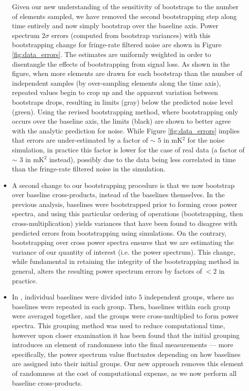 \documentclass[preprint2,numberedappendix,tighten]{aastex6}  %
\begin{document}
\begin{itemize}
{Given our new understanding of the sensitivity of bootstraps to the number of elements sampled, we have removed the second 
bootstrapping step along time entirely and now simply bootstrap over the baseline axis. Power spectrum $2\sigma$ errors (computed from bootstrap variances) with this bootstrapping change for fringe-rate filtered noise are shown in Figure 
\ref{fig:data_errors}. The estimates are uniformly weighted in order to disentangle the effects of bootstrapping from signal loss. As 
shown in the figure, when more elements are drawn for each bootstrap than the number of 
independent samples (by over-sampling elements along the time axis), repeated values begin to crop up and the apparent variation between bootstraps drops, resulting in limits (gray) below the predicted noise level (green). Using the revised bootstrapping method, where bootstrapping only occurs over the baseline axis, the limits (black) are shown to better agree with the analytic prediction for noise. While Figure \ref{fig:data_errors} implies that errors are under-estimated by a factor of $\sim$ $5$ in mK$^{2}$ for the noise simulation, in practice this factor is lower for the case of real data (a factor of $\sim$ $3$ in mK$^{2}$ instead), possibly due to the data being less correlated in time than the fringe-rate filtered noise in the simulation. }%

\item{A second change to our bootstrapping procedure is that we now bootstrap over baseline cross-products, instead of the baselines themselves. In the previous analysis, baselines were bootstrapped prior to forming cross power spectra, and using this particular ordering of operations (bootstrapping, then cross-multiplication) yields variances that have been found to disagree with predicted errors from bootstrapping using simulations. On the contrary, bootstrapping over cross power spectra ensures that we are estimating the variance of our quantity of interest (i.e. the power spectrum). This change, while fundamental in retaining the integrity of the bootstrapping method in general, alters the resulting power spectrum errors by factors of $<2$ in practice.}

\item{In , individual baselines were divided into $5$ independent groups, where no baselines were repeated in each group. Then, baselines within each group were averaged together, and the groups were cross-multiplied to form power spectra. This grouping method was used to reduce computational time, however upon closer examination it has been found that the initial grouping introduces an element of randomness into the final measurements --- more specifically, the power spectrum value fluctuates depending on how baselines are assigned into their initial groups. Our new approach removes this element of randomness at the cost of computational expense, as we now perform all baseline cross-products.}


\end{itemize}
\end{document}
